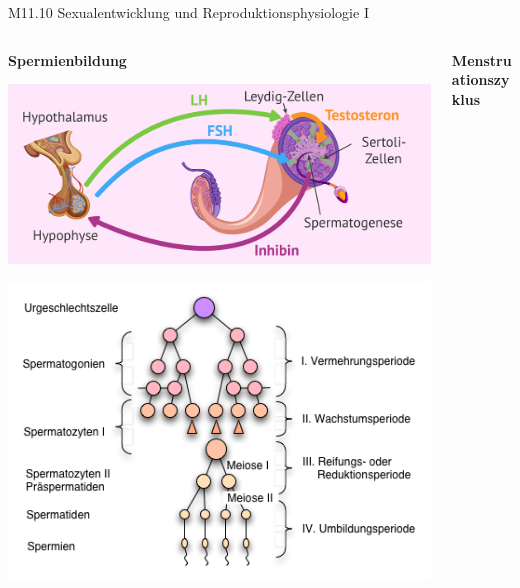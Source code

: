 \documentclass{beamer}
\begin{document}
\begin{frame}{M11.10 Sexualentwicklung und Reproduktionsphysiologie I}

\begin{columns}[t]

\begin{column}{5cm}

\textbf{Spermienbildung}

\begin{center}
        \includegraphics[width=\textwidth]{hormonelle-regulierung-spermatogenese.png}


    \includegraphics[width=\textwidth]{Spermatogenese.png}
    
\end{center}



\end{column}

\pause

\begin{column}{5cm}
\textbf{Menstruationszyklus}


\end{column}
\end{columns}
\end{frame}
\end{document}
